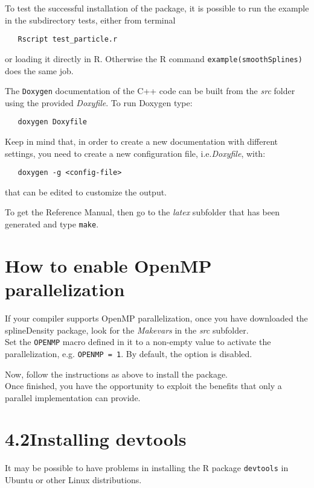 \medskip

To test the successful installation of the package, it is possible to run the example in the subdirectory tests, either from terminal
\begin{verbatim}
   Rscript test_particle.r
\end{verbatim}
or loading it directly in R. Otherwise the R command \verb|example(smoothSplines)| does the same job.

\medskip

The \verb|Doxygen| documentation of the C++ code can be built from the \textit{src} folder using the provided \textit{Doxyfile}. To run Doxygen type:
\begin{verbatim}
   doxygen Doxyfile
\end{verbatim}
Keep in mind that, in order to create a new documentation with different settings, you need to create a new configuration file, i.e.\textit{Doxyfile}, with:
\begin{verbatim}
   doxygen -g <config-file>
\end{verbatim}
that can be edited to customize the output.

To get the Reference Manual, then go to the \textit{latex} subfolder that has been generated and type \verb|make|.



\section{How to enable OpenMP parallelization}
If your compiler supports OpenMP parallelization, once you have downloaded the splineDensity package, look for the \textit{Makevars} in the \textit{src} subfolder.\\
Set the \verb|OPENMP| macro defined in it to a non-empty value to activate the parallelization, e.g. \verb|OPENMP = 1|. By default, the option is disabled.

Now, follow the instructions as above to install the package. \\
Once finished, you have the opportunity to exploit the benefits that only a parallel implementation can provide.



\section*{4.2\quad Installing devtools}
It may be possible to have problems in installing the R package \verb|devtools| in Ubuntu or other Linux distributions.

